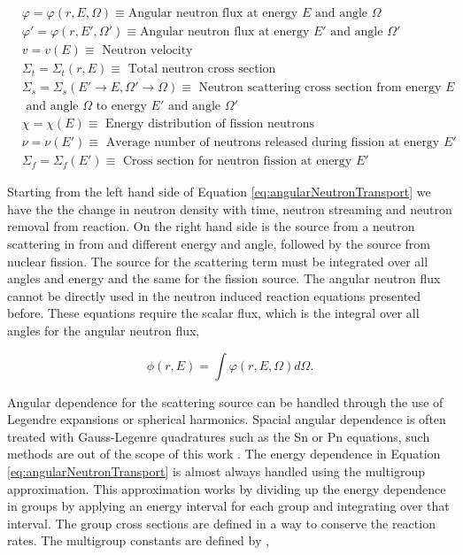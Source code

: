$\begin{aligned}
&\varphi = \varphi(r, E, \Omega) \equiv   \text{Angular neutron flux at energy } E \text{ and angle } \Omega  \\
&\varphi' = \varphi(r, E', \Omega') \equiv   \text{Angular neutron flux at energy } E' \text{ and angle } \Omega'  \\
& v = v(E) \equiv \text{ Neutron velocity} \\
&\Sigma_{t} = \Sigma_{t}(r, E) \equiv \text{ Total neutron cross section} \\
&\Sigma_{s} = \Sigma_{s}(E' \rightarrow E,\Omega' \rightarrow \Omega) \equiv \text{ Neutron scattering cross section from energy } E \\
& \text{ and angle } \Omega \text{ to energy } E' \text{ and angle } \Omega' \\
&\chi = \chi(E) \equiv \text{ Energy distribution of fission neutrons} \\
&\nu = \nu(E') \equiv \text{ Average number of neutrons released during fission at energy } E' \\ 
&\Sigma_{f} = \Sigma_{f}(E') \equiv \text{ Cross section for neutron fission at energy } E' 
\end{aligned}$

\vspace{0.5cm}

\noindent Starting from the left hand side of Equation \ref{eq:angularNeutronTransport} we have the the change in neutron density with time, neutron streaming and neutron removal from reaction. On the right hand side is the source from a neutron scattering in from and different energy and angle, followed by the source from nuclear fission. The source for the scattering term must be integrated over all angles and energy and the same for the fission source. The angular neutron flux cannot be directly used in the neutron induced reaction equations presented before. These equations require the scalar flux, which is the integral over all angles for the angular neutron flux,

\begin{equation}
    \phi(r,E) = \int \varphi(r,E,\Omega)d \Omega.
\end{equation}

Angular dependence for the scattering source can be handled through the use of Legendre expansions or spherical harmonics. Spacial angular dependence is often treated with Gauss-Legenre quadratures such as the Sn or Pn equations, such methods are out of the scope of this work \cite{millerCompTransport}. The energy dependence in Equation \ref{eq:angularNeutronTransport} is almost always handled using the multigroup approximation. This approximation works by dividing up the energy dependence in groups by applying an energy interval for each group and integrating over that interval. The group cross sections are defined in a way to conserve the reaction rates. The multigroup constants are defined by \cite{millerCompTransport} \cite{duderstadt1976},

